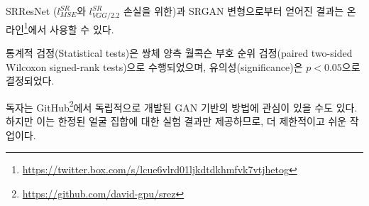 \documentclass[10pt,twocolumn,letterpaper]{article}
\newcommand{\kor}[1]{#1}
\newcommand{\eng}[1]{}
\newcommand{\summary}[1]{}
\begin{document}
\eng{
Results obtained with SRResNet (for losses: $l^{SR}_{MSE}$ and $l^{SR}_{VGG/2.2}$) and the SRGAN variants are available online\footnote{\url{https://twitter.box.com/s/lcue6vlrd01ljkdtdkhmfvk7vtjhetog}}.
}\kor{
SRResNet ($l^{SR}_{MSE}$와 $l^{SR}_{VGG/2.2}$ 손실을 위한)과 SRGAN 변형으로부터 얻어진 결과는 온라인\footnote{\url{https://twitter.box.com/s/lcue6vlrd01ljkdtdkhmfvk7vtjhetog}}에서 사용할 수 있다.
}
\eng{
Statistical tests were performed as paired two-sided Wilcoxon signed-rank tests and significance determined at $p<0.05$.
}\kor{
통계적 검정(Statistical tests)은 쌍체 양측 월콕슨 부호 순위 검정(paired two-sided Wilcoxon signed-rank tests)으로 수행되었으며, 유의성(significance)은 $p<0.05$으로 결정되었다.
}

\summary{
세 가지 데이터 세트(Set5, Set14, BSD100-BSD300)에 대한 실험을 수행했으며, PSNR 및 SSIM 지표를 이용하여 측정한 값들을 통계적 테스트를 이용하여 비교함.
}

\eng{
The reader may also be interested in an independently developed GAN-based solution on GitHub\footnote{\url{https://github.com/david-gpu/srez}}. However it only provides experimental results on a limited set of faces, which is a more constrained and easier task.
}\kor{
독자는 GitHub\footnote{\url{https://github.com/david-gpu/srez}}에서 독립적으로 개발된 GAN 기반의 방법에 관심이 있을 수도 있다. 하지만 이는 한정된 얼굴 집합에 대한 실험 결과만 제공하므로, 더 제한적이고 쉬운 작업이다.
}

\summary{
GitHub에서 개발된 GAN 방법의 한계 제시
}
\end{document}
